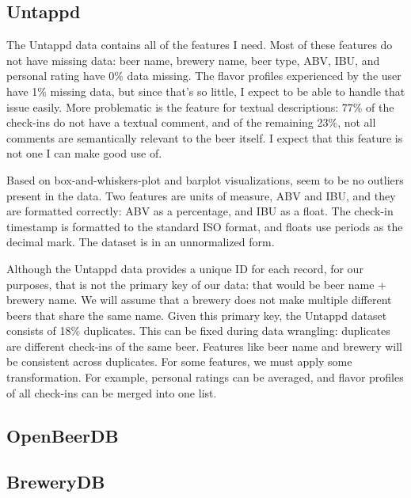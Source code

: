 \documentclass[sigconf, natbib=true]{acmart}
\begin{document}
\subsection{Untappd}
The Untappd data contains all of the features I need.
Most of these features do not have missing data: beer name, brewery name, beer type, ABV, IBU, and personal rating have 0\% data missing.
The flavor profiles experienced by the user have 1\% missing data, but since that's so little, I expect to be able to handle that issue easily.
More problematic is the feature for textual descriptions: 77\% of the check-ins do not have a textual comment, and of the remaining 23\%, not all comments are semantically relevant to the beer itself.
I expect that this feature is not one I can make good use of.

Based on box-and-whiskers-plot and barplot visualizations, seem to be no outliers present in the data.
Two features are units of measure, ABV and IBU, and they are formatted correctly: ABV as a percentage, and IBU as a float.
The check-in timestamp is formatted to the standard ISO format, and floats use periods as the decimal mark.
The dataset is in an unnormalized form.

Although the Untappd data provides a unique ID for each record, for our purposes, that is not the primary key of our data: that would be beer name + brewery name.
We will assume that a brewery does not make multiple different beers that share the same name.
Given this primary key, the Untappd dataset consists of 18\% duplicates.
This can be fixed during data wrangling: duplicates are different check-ins of the same beer.
Features like beer name and brewery will be consistent across duplicates.
For some features, we must apply some transformation. 
For example, personal ratings can be averaged, and flavor profiles of all check-ins can be merged into one list.

\subsection{OpenBeerDB}

\subsection{BreweryDB}
\end{document}
